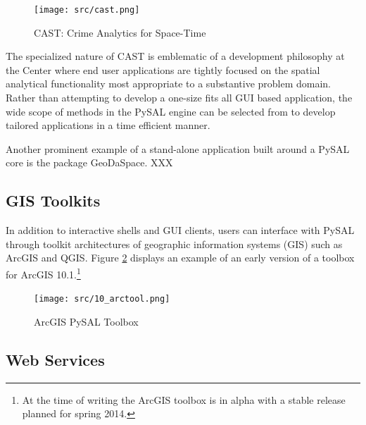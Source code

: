 \documentclass[11pt, titlepage]{article}
\begin{document}
\begin{figure}[ht]
  \begin{center}
    \texttt{[image: src/cast.png]}
  \end{center}
     \caption{CAST: Crime Analytics for Space-Time}
     \label{f:cast}
      \end{figure}      

The specialized nature of CAST is emblematic of a development philosophy
at the Center where end user applications are tightly focused on the
spatial analytical functionality most appropriate to a substantive
problem domain. Rather than attempting to develop a one-size fits all
GUI based application, the wide scope of methods in the PySAL engine can
be selected from to develop tailored applications in a time efficient
manner.

Another prominent example of a stand-alone application built around a
PySAL core is the package GeoDaSpace. XXX

\subsection{GIS Toolkits}

In addition to interactive shells and GUI clients, users can interface
with PySAL through toolkit architectures of geographic information
systems (GIS) such as ArcGIS and QGIS. Figure \ref{f:arcgis} displays an example of an
early version of a toolbox for ArcGIS 10.1.\footnote{At the time of
  writing the ArcGIS toolbox is in alpha with a stable release planned
  for spring 2014.}


\begin{figure}[ht]
\begin{center}
\texttt{[image: src/10\_arctool.png]}
\end{center}
\caption{ArcGIS PySAL Toolbox}
\label{f:arcgis}
\end{figure}   


\subsection{Web Services}
\end{document}
